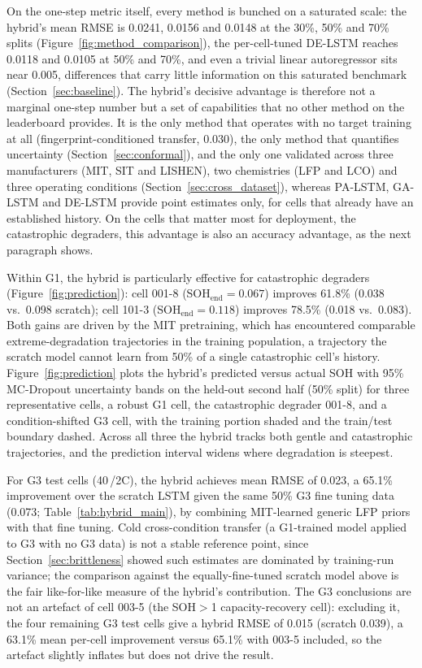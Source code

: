 On the one-step metric itself, every method is bunched on a saturated scale:
the hybrid's mean RMSE is 0.0241, 0.0156 and 0.0148 at the 30\%, 50\% and 70\%
splits (Figure~\ref{fig:method_comparison}), the per-cell-tuned DE-LSTM reaches
0.0118 and 0.0105 at 50\% and 70\%, and even a trivial linear autoregressor sits
near 0.005, differences that carry little information on this saturated benchmark
(Section~\ref{sec:baseline}). The hybrid's decisive advantage is therefore not a
marginal one-step number but a set of capabilities that no other method on the
leaderboard provides. It is the only method that operates with no target training
at all (fingerprint-conditioned transfer, 0.030), the only method that quantifies uncertainty
(Section~\ref{sec:conformal}), and the only one validated across three
manufacturers (MIT, SIT and LISHEN), two chemistries (LFP and LCO) and three
operating conditions (Section~\ref{sec:cross_dataset}), whereas PA-LSTM, GA-LSTM
and DE-LSTM provide point estimates only, for cells that already have an
established history. On the cells that matter most for deployment, the
catastrophic degraders, this advantage is also an accuracy advantage, as the
next paragraph shows.

Within G1, the hybrid is particularly effective for catastrophic degraders
(Figure~\ref{fig:prediction}):
cell 001-8 (SOH$_\text{end}=0.067$) improves 61.8\%
(0.038 vs.\ 0.098 scratch); cell 101-3 (SOH$_\text{end}=0.118$) improves
78.5\% (0.018 vs.\ 0.083).
Both gains are driven by the MIT pretraining, which has encountered
comparable extreme-degradation trajectories in the training population,
a trajectory the scratch model cannot learn from 50\% of a single
catastrophic cell's history.
Figure~\ref{fig:prediction} plots the hybrid's predicted versus actual SOH with
95\% MC-Dropout uncertainty bands on the held-out second half (50\% split) for
three representative cells, a robust G1 cell, the catastrophic degrader 001-8,
and a condition-shifted G3 cell, with the training portion shaded and the
train/test boundary dashed.
Across all three the hybrid tracks both gentle and catastrophic trajectories, and
the prediction interval widens where degradation is steepest.

For G3 test cells (40\,\textcelsius/2C), the hybrid achieves mean RMSE of
0.023, a 65.1\% improvement over the scratch LSTM given the same 50\% G3 fine
tuning data (0.073; Table~\ref{tab:hybrid_main}), by combining MIT-learned
generic LFP priors with that fine tuning.
Cold cross-condition transfer (a G1-trained model applied to G3 with no G3
data) is not a stable reference point, since Section~\ref{sec:brittleness}
showed such estimates are dominated by training-run variance; the comparison
against the equally-fine-tuned scratch model above is the fair like-for-like
measure of the hybrid's contribution.
The G3 conclusions are not an artefact of cell 003-5 (the SOH$>$1
capacity-recovery cell): excluding it, the four remaining G3 test cells give a
hybrid RMSE of 0.015 (scratch 0.039), a 63.1\% mean per-cell improvement versus
65.1\% with 003-5 included, so the artefact slightly inflates but does not
drive the result.

